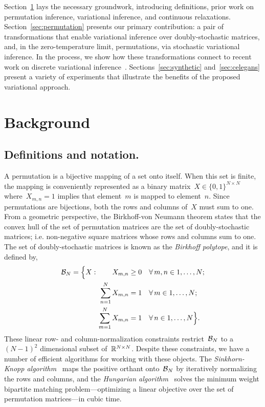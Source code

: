 \documentclass[twoside]{article}
\begin{document}
Section~\ref{sec:background} lays the necessary groundwork,
introducing definitions, prior work on permutation inference,
variational inference, and continuous relaxations.
Section~\ref{sec:permutation} presents our primary contribution: a
pair of transformations that enable variational inference over
doubly-stochastic matrices, and, in the zero-temperature limit,
permutations, via stochastic variational inference.  In the process,
we show how these transformations connect to recent work on discrete
variational inference~\citep{maddison2016concrete,
  jang2016categorical, balog2017lost}.  Sections~\ref{sec:synthetic}
and~\ref{sec:celegans} present a variety of experiments that
illustrate the benefits of the proposed variational approach.
  
\section{Background}
\label{sec:background}


\subsection{Definitions and notation.}  A permutation is a bijective
mapping of a set onto itself.  When this set is finite, the mapping is
conveniently represented as a binary
matrix~${X \in \{0,1\}^{N \times N}}$ where~${X_{m,n}=1}$ implies that
element~$m$ is mapped to element~$n$.  Since permutations are
bijections, both the rows and columns of~$X$ must sum to one.  From a
geometric perspective, the Birkhoff-von Neumann theorem states that
the convex hull of the set of permutation matrices are the set of
doubly-stochastic matrices; i.e. non-negative square matrices whose
rows and columns sum to one. The set of doubly-stochastic matrices is
known as the \emph{Birkhoff polytope}, and it is defined by,
\begin{align*}
  \mathcal{B}_N = \Big \{X : \qquad 
           X_{m,n} &\geq 0   & &\forall \, m,n \in 1, \ldots, N; \\
           \sum_{n=1}^N X_{m,n} &= 1  & &\forall \, m \in 1, \ldots, N; \\
           \sum_{m=1}^N X_{m,n} & =1 &  &\forall \, n \in 1, \ldots, N \Big\}.
\end{align*}
These linear row- and column-normalization constraints
restrict~$\mathcal{B}_N$ to a~${(N-1)^2}$ dimensional subset
of~$\mathbb{R}^{N \times N}$.  Despite these constraints, we have a number
of efficient algorithms for working with these objects.  The
\emph{Sinkhorn-Knopp algorithm}~\citep{sinkhorn1967concerning}
maps the positive orthant onto~$\mathcal{B}_N$ by iteratively normalizing
the rows and columns, and the \emph{Hungarian
  algorithm}~\citep{kuhn1955hungarian, munkres1957algorithms} solves
the minimum weight bipartite matching problem---optimizing a linear
objective over the set of permutation matrices---in cubic time.
\end{document}
